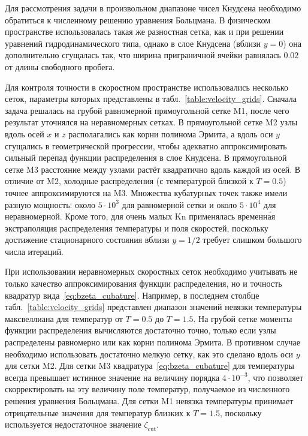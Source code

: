 \documentclass[
aps,%
12pt,%
final,%
notitlepage,%
oneside,%
onecolumn,%
nobibnotes,%
nofootinbib,%
superscriptaddress,%
noshowpacs,%
showkeys,%
tightenlines,%
centertags]%
{revtex4}
\newcommand{\Kn}{\mathrm{Kn}}
\begin{document}
Для рассмотрения задачи в произвольном диапазоне чисел Кнудсена необходимо
обратиться к численному решению уравнения Больцмана.
В физическом пространстве использовалась такая же разностная сетка,
как и при решении уравнений гидродинамического типа,
однако в слое Кнудсена (вблизи \(y=0\)) она дополнительно сгущалась так,
что ширина приграничной ячейки равнялась \(0.02\) от длины свободного пробега.

Для контроля точности в скоростном пространстве использовались несколько сеток,
параметры которых представлены в табл.~\ref{table:velocity_grids}.
Сначала задача решалась на грубой равномерной прямоугольной сетке M1,
после чего результат уточнялся на неравномерных сетках.
В прямоугольной сетке M2 узлы вдоль осей \(x\) и \(z\) располагались как корни полинома Эрмита,
а вдоль оси \(y\) сгущались в геометрической прогрессии,
чтобы адекватно аппроксимировать сильный перепад функции распределения в слое Кнудсена.
В прямоугольной сетке M3 расстояние между узлами растёт квадратично вдоль каждой из осей.
В отличие от M2, холодные распределения (с температурой близкой к \(T=0.5\)) точнее аппроксимируются на M3.
Множества кубатурных точек также имели разную мощность: около \(5\cdot10^3\) для равномерной сетки
и около \(5\cdot10^4\) для неравномерной.
Кроме того, для очень малых \(\Kn\) применялась временн\'{а}я экстраполяция распределения температуры
и поля скоростей, поскольку достижение стационарного состояния вблизи \(y=1/2\)
требует слишком большого числа итераций.

При использовании неравномерных скоростных сеток необходимо учитывать не только качество аппроксимирования
функции распределения, но и точность квадратур вида~\eqref{eq:bzeta_cubature}.
Например, в последнем столбце табл.~\ref{table:velocity_grids} представлен диапазон значений невязки температуры
максвеллиана для температур от \(T=0.5\) до \(T=1.5\).
На грубой сетке моменты функции распределения вычисляются достаточно точно,
только если узлы распределены равномерно или как корни полинома Эрмита.
В противном случае необходимо использовать достаточно мелкую сетку,
как это сделано вдоль оси \(y\) для сетки M2.
Для сетки M3 квадратура~\eqref{eq:bzeta_cubature} для температуры всегда превышает истинное значение
на величину порядка \(4\cdot10^{-3}\), что позволяет скорректировать на эту величину поле температур,
получаемое из численного решения уравнения Больцмана.
Для сетки M1 невязка температуры принимает отрицательные значения для температур близких к \(T=1.5\),
поскольку используется недостаточное значение \(\zeta_{\mathrm{cut}}\).
\end{document}
